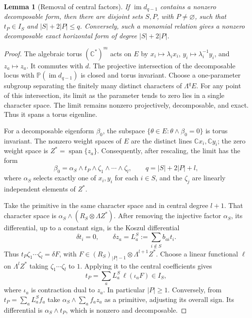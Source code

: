 \documentclass[12pt]{amsart}
\newcommand{\lemword}{Lemma}
\newtheorem{lem}[thm]{\lemword}
\theoremstyle{definition}
\theoremstyle{remark}
\numberwithin{equation}{section}
\newcommand{\C}{\mathbb{C}}
\begin{document}
\begin{lem}[Removal of central factors]\label{en:reduction}
If $\operatorname{im}d_{q-1}$ contains a nonzero decomposable form, then
there are disjoint sets $S,P$, with $P\ne\varnothing$, such that
$t_P\in I_S$ and $|S|+2|P|\leq q$.
Conversely, such a monomial relation gives a nonzero decomposable exact
horizontal form of degree $|S|+2|P|$.
\end{lem}
\begin{proof}
The algebraic torus $(\C^*)^m$ acts on $E$ by
$x_i\mapsto\lambda_i x_i$, $y_i\mapsto\lambda_i^{-1}y_i$, and $z_a\mapsto z_a$.
It commutes with $d$. The projective intersection of the decomposable locus
with $\mathbb P(\operatorname{im}d_{q-1})$ is closed and torus invariant.
Choose a one-parameter subgroup separating the finitely many distinct
characters of $\Lambda^qE$. For any point of this intersection, its limit
as the parameter tends to zero lies in a single character space. The limit
remains nonzero projectively, decomposable, and exact. Thus it spans a
torus eigenline.

For a decomposable eigenform $\beta_0$, the subspace
$\{\theta\in E:\theta\wedge\beta_0=0\}$ is torus invariant.
The nonzero weight spaces of $E$ are the distinct lines $\C x_i,\C y_i$;
the zero weight space is $Z^*=\operatorname{span}\{z_a\}$. Consequently,
after rescaling, the limit has the form
\begin{equation}\label{en:fixed-form}
 \beta_0=\alpha_S\wedge t_P\wedge\zeta_1\wedge\cdots\wedge\zeta_l,
 \qquad q=|S|+2|P|+l,
\end{equation}
where $\alpha_S$ selects exactly one of $x_i,y_i$ for each $i\in S$, and the
$\zeta_j$ are linearly independent elements of $Z^*$.

Take the primitive in the same character space and in central degree $l+1$.
That character space is $\alpha_S\wedge(R_S\otimes\Lambda Z^*)$.
After removing the injective factor $\alpha_S$, its differential, up to a
constant sign, is the Koszul differential
\[
 \delta t_i=0,\qquad \delta z_a=L_a^S:=\sum_{i\notin S}b_{ai}t_i.
\]
Thus $t_P\zeta_1\cdots\zeta_l=\delta F$, with
$F\in(R_S)_{|P|-1}\otimes\Lambda^{l+1}Z^*$.
Choose a linear functional $\ell$ on $\Lambda^lZ^*$ taking
$\zeta_1\cdots\zeta_l$ to $1$. Applying it to the central coefficients gives
\[
 t_P=\sum_a L_a^S\,\ell(\iota_a F)\in I_S,
\]
where $\iota_a$ is contraction dual to $z_a$.
In particular $|P|\geq1$.
Conversely, from $t_P=\sum_a L_a^Sf_a$ take
$\alpha_S\wedge\sum_a f_a z_a$ as a primitive, adjusting its overall sign.
Its differential is $\alpha_S\wedge t_P$, which is nonzero and decomposable.
\end{proof}
\end{document}
